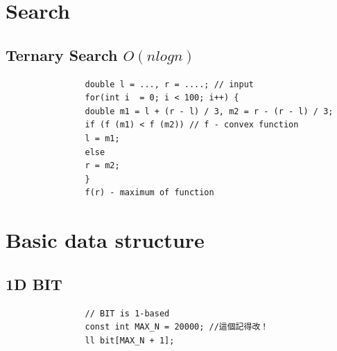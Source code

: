 \documentclass[10pt,oneside]{article}
\begin{document}
\begin{landscape}
\begin{multicols}{2}
				
				
				
				
				\section{Search}
				
				\subsection{Ternary Search $O(nlogn)$}
				
				\begin{verbatim}
				double l = ..., r = ....; // input
				for(int i  = 0; i < 100; i++) {
				double m1 = l + (r - l) / 3, m2 = r - (r - l) / 3;
				if (f (m1) < f (m2)) // f - convex function
				l = m1;
				else
				r = m2;
				}
				f(r) - maximum of function
				\end{verbatim}
				
				
				
				
				\section{Basic data structure}
				
				\subsection{1D BIT}
				
				\begin{verbatim}
				// BIT is 1-based
				const int MAX_N = 20000; //這個記得改！
				ll bit[MAX_N + 1];
				

\end{verbatim}
\end{multicols}
\end{landscape}
\end{document}

